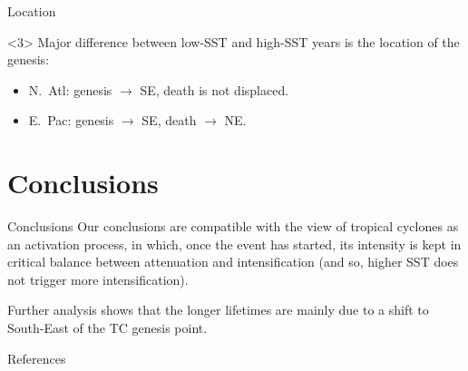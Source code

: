 \begin{frame}{Location}
	\begin{onlyenv}
		Major difference between low-SST and high-SST years is the location of the genesis:
		\begin{itemize}
			\item N.~Atl: genesis $\to$ SE, death is not displaced.
			\item E.~Pac: genesis $\to$ SE, death $\to$ NE.
		\end{itemize}
	\end{onlyenv}
\end{frame}


\section{Conclusions}

\begin{darkframes}
\begin{frame}{Conclusions}
	Our conclusions are compatible with the view of tropical cyclones as an activation process, in which, once the event has started, its intensity is kept in critical balance between attenuation and intensification (and so, higher SST does not trigger more intensification).

	\medskip
	Further analysis shows that the longer lifetimes are mainly due to a shift to South-East of the TC genesis point.
\end{frame}
\end{darkframes}

\appendix
\begin{frame}[allowframebreaks]{References}
	\def\newblock{}
	\nocite{Hinkley1997}
	\footnotesize{
	\printbibliography[heading=bibintoc]
	}
\end{frame}

